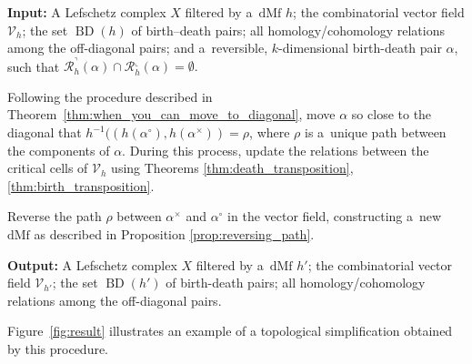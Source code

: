 \documentclass[a4paper,12pt, USenglish,cleveref,autoref,thm-restate]{article}
\newcommand\michal[1]{\textcolor{magenta}{[ML: #1]}}
\newcommand{\mf}{h}
\newcommand{\omf}{h'}
\DeclareMathOperator{\bd}{BD}
\newcommand{\dmf}{\text{dMf}}
\newcommand{\fhR}{\mathcal{R}^\urcorner}
\newcommand{\fcR}{\mathcal{R}^\llcorner}
\newcommand{\bth}[1]{#1^\circ}
\newcommand{\dth}[1]{#1^{\!\times}}
\newcommand{\bds}{\alpha}
\newcommand{\cV}{\mathcal{V}}
\begin{document}
\noindent
\textbf{Input:} A Lefschetz complex $X$ filtered by a~$\dmf$ $\mf$; the combinatorial vector field $\cV_{\mf}$; the set $\bd(\mf)$ of birth–death pairs; all homology/cohomology relations among the off-diagonal pairs;
and a~reversible, $k$-dimensional birth-death pair $\bds$, such that $\fhR_{\mf}(\bds) \cap \fcR_{\mf}(\bds)
  = \emptyset. $


\begin{bracketenumerate}
    

    
   
    \item Following the procedure described in Theorem~\ref{thm:when_you_can_move_to_diagonal}, move $\bds$ so close to the diagonal that $\mf^{-1}((\mf(\bth\bds),\mf(\dth\bds)) = \rho$, where $\rho$ is a~unique path between the components of $\bds$. During this process, update the relations between the critical cells of $\cV_{\mf}$ using Theorems \ref{thm:death_transposition}, \ref{thm:birth_transposition}.\label{step:move}
    
    \item Reverse the path $\rho$ between $\dth\bds$ and $\bth\bds$ in the vector field, constructing a~new $\dmf$ as described in Proposition \ref{prop:reversing_path}.\label{step:reverse}


\end{bracketenumerate}

\noindent
\textbf{Output:} A Lefschetz complex $X$ filtered by a~$\dmf$ $\omf$; the combinatorial vector field $\cV_{\omf}$; the set $\bd(\omf)$ of birth-death pairs; all homology/cohomology relations among the off-diagonal pairs.


\noindent Figure~\ref{fig:result} illustrates an example of a topological simplification obtained by this procedure.
\end{document}
